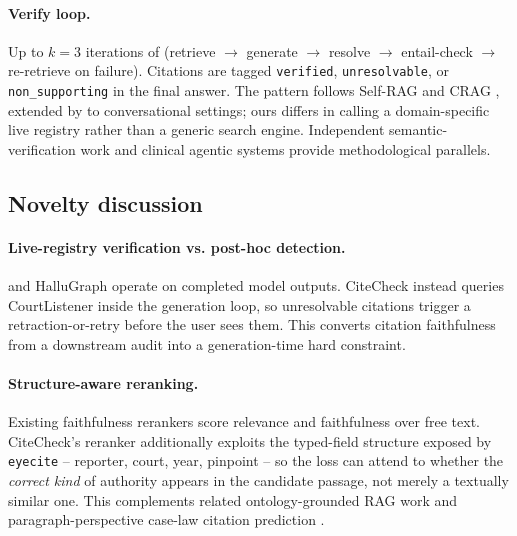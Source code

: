 \documentclass[11pt]{article}
\begin{document}
\paragraph{Verify loop.}
Up to $k = 3$ iterations of
(retrieve $\rightarrow$ generate $\rightarrow$ resolve $\rightarrow$
entail-check $\rightarrow$ re-retrieve on failure). Citations are
tagged \texttt{verified}, \texttt{unresolvable}, or
\texttt{non\_supporting} in the final answer. The pattern follows
Self-RAG \citep{asai2023selfrag} and CRAG \citep{yan2024crag},
extended by \citet{anand2026selfcrag} to conversational settings;
ours differs in calling a domain-specific live registry rather than a
generic search engine. Independent semantic-verification work
\citep{martin2024semanticverification,yue2024fact} and clinical
agentic systems \citep{low2025clinical} provide methodological
parallels.

\subsection{Novelty discussion}
\label{sec:method:novelty}

\paragraph{Live-registry verification vs. post-hoc detection.}
\citet{magesh2025hallucination} and HalluGraph
\citep{noel2025hallugraph} operate on completed model outputs.
CiteCheck instead queries CourtListener inside the generation loop, so
unresolvable citations trigger a retraction-or-retry before the user
sees them. This converts citation faithfulness from a downstream
audit into a generation-time hard constraint.

\paragraph{Structure-aware reranking.}
Existing faithfulness rerankers
\citep{guan2025faithfulnessaware,khan2026reasonverify} score relevance
and faithfulness over free text. CiteCheck's reranker additionally
exploits the typed-field structure exposed by \texttt{eyecite} --
reporter, court, year, pinpoint -- so the loss can attend to whether
the \emph{correct kind} of authority appears in the candidate
passage, not merely a textually similar one. This complements
related ontology-grounded RAG work \citep{clarizia2025ontologyrag} and
paragraph-perspective case-law citation prediction
\citep{olsen2023paragraphcaselaw}.
\end{document}
